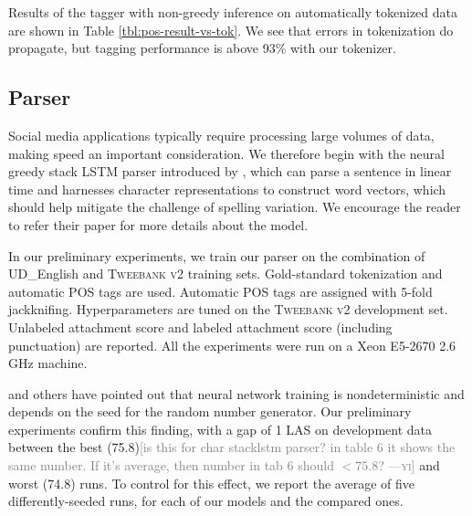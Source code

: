 \documentclass[11pt,a4paper]{article}
\newcommand{\yicomment}[1]{\textcolor{gray}{[#1 ---\textsc{yi}]}}
\begin{document}
Results of the \citet{owoputi-EtAl:2013:NAACL-HLT}  tagger with non-greedy
inference on automatically tokenized data
are shown in  Table \ref{tbl:pos-result-vs-tok}.  We see that errors
in tokenization do propagate, but tagging performance is above 93\%
with our tokenizer. 

\subsection{Parser}

Social media applications typically require processing large volumes
of data, making speed an important consideration. We therefore 
begin with the neural greedy stack LSTM parser introduced by ,
which can parse a sentence in linear time and harnesses 
character representations to construct word vectors, which should help mitigate the challenge of
spelling variation. We encourage the reader to refer their paper for
more details about the model.

In our preliminary experiments, we train our parser on the combination of UD\_English
and \textsc{Tweebank v2} training sets. Gold-standard tokenization and automatic POS
tags are used. Automatic POS tags are assigned with 5-fold
jackknifing. Hyperparameters %
are tuned on the \textsc{Tweebank v2} development set. Unlabeled attachment score and
labeled attachment score (including punctuation) are reported.
All the experiments were run on a Xeon E5-2670 2.6 GHz machine.

\citet{reimers-gurevych:2017:EMNLP2017} and others have
pointed out that neural network training is 
nondeterministic and depends on the seed for the random
number generator.
Our preliminary experiments confirm this finding, with a gap of 1 LAS on development data
between the best (75.8)\yicomment{is this for char stacklstm parser? in table 6 it shows the same number. If it's average, then number in tab 6 should $< 75.8$?} and worst (74.8) runs. To control for this
effect, we report the average of five differently-seeded runs, for
each of our models and the compared ones.
\end{document}

